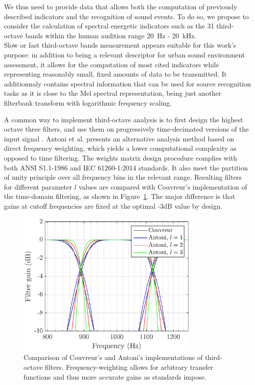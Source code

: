\documentclass[sensors,article,submit,moreauthors,pdftex,10pt,a4paper]{mdpi}
\begin{document}
We thus need to provide data that allows both the computation of previously described indicators and the recognition of sound events.
To do so, we propose to consider the calculation of spectral energetic indicators such as the 31 third-octave bands within the human audition range 20~Hz - 20~kHz.\\ Slow or fast third-octave bands measurement appears suitable for this work's purpose: in addition to being a relevant descriptor \cite{torija2013} for urban sound environment assessment, it allows for the computation of most cited indicators while representing reasonably small, fixed amounts of data to be transmitted. It additionnaly contains spectral information that can be used for source recognition tasks as it is close to the Mel spectral representation, being just another filterbank transform with logarithmic frequency scaling.

A common way to implement third-octave analysis is to first design the highest octave three filters, and use them on progressively time-decimated versions of the input signal \cite{davis1986}. Antoni et al. \cite{antoni2010} presents an alternative analysis method based on direct frequency weighting, which yields a lower computational complexity as opposed to time filtering. The weights matrix design procedure complies with both ANSI S1.1-1986 \cite{citeulike:9580295} and IEC 61260-1:2014 \cite{iec-norm} standards. It also meet the partition of unity principle over all frequency bins in the relevant range. Resulting filters for different parameter $l$ values are compared with Couvreur's implementation \cite{couvreur} of the time-domain filtering, as shown in Figure~\ref{fig:freq_filt}. The major difference is that gains at cutoff frequencies are fixed at the optimal -3dB value by design.\\

\begin{figure}[htbp]
	\centering
		\includegraphics[width=0.8\textwidth]{figures/tob_imp.eps}
	\caption{Comparison of Couvreur's and Antoni's implementations of third-octave filters. Frequency-weighting allows for arbitrary transfer functions and thus more accurate gains as standards impose.}
	\label{fig:freq_filt}
\end{figure}
\end{document}
